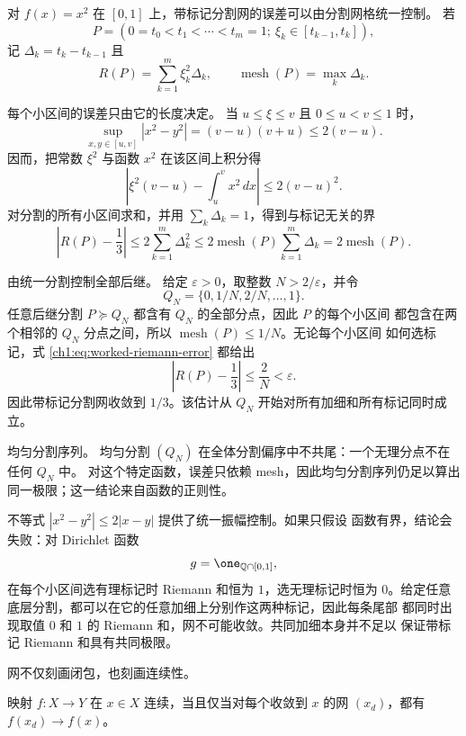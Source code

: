 \begin{example}[带标记分割网的误差估计]
\label{ch1:exa:worked-riemann-refinement}
对 $f(x)=x^2$ 在 $[0,1]$ 上，带标记分割网的误差可以由分割网格统一控制。
若
\[
 P=(0=t_0<t_1<\cdots<t_m=1;\ \xi_k\in[t_{k-1},t_k]),
\]
记 $\Delta_k=t_k-t_{k-1}$ 且
\[
 R(P)=\sum_{k=1}^m\xi_k^2\Delta_k,
 \qquad \operatorname{mesh}(P)=\max_k\Delta_k.
\]

\medskip
\noindent 每个小区间的误差只由它的长度决定。
当 $u\leq\xi\leq v$ 且 $0\leq u<v\leq1$ 时，
\[
 \sup_{x,y\in[u,v]}|x^2-y^2|
 =(v-u)(v+u)\leq2(v-u).
\]
因而，把常数 $\xi^2$ 与函数 $x^2$ 在该区间上积分得
\[
 \left|\xi^2(v-u)-\int_u^v x^2\,dx\right|
 \leq 2(v-u)^2.
\]
对分割的所有小区间求和，并用
$\sum_k\Delta_k=1$，得到与标记无关的界
\begin{equation}
 \left|R(P)-\frac13\right|
 \leq2\sum_{k=1}^m\Delta_k^2
 \leq2\operatorname{mesh}(P)\sum_{k=1}^m\Delta_k
 =2\operatorname{mesh}(P).
 \label{ch1:eq:worked-riemann-error}
\end{equation}

\medskip
\noindent 由统一分割控制全部后继。
给定 $\varepsilon>0$，取整数 $N>2/\varepsilon$，并令
\[
 Q_N=\{0,1/N,2/N,\ldots,1\}.
\]
任意后继分割 $P\succeq Q_N$ 都含有 $Q_N$ 的全部分点，因此 $P$ 的每个小区间
都包含在两个相邻的 $Q_N$ 分点之间，所以 $\operatorname{mesh}(P)\leq1/N$。无论每个小区间
如何选标记，式 \eqref{ch1:eq:worked-riemann-error} 都给出
\[
 \left|R(P)-\frac13\right|\leq\frac2N<\varepsilon.
\]
因此带标记分割网收敛到 $1/3$。该估计从 $Q_N$ 开始对所有加细和所有标记同时成立。

\medskip
\noindent 均匀分割序列。
均匀分割 $(Q_N)$ 在全体分割偏序中不共尾：一个无理分点不在任何 $Q_N$ 中。
对这个特定函数，误差只依赖 mesh，因此均匀分割序列仍足以算出同一极限；这一结论来自函数的正则性。

\medskip
不等式 $|x^2-y^2|\leq2|x-y|$ 提供了统一振幅控制。如果只假设
函数有界，结论会失败：对 Dirichlet 函数
\[
 g=\one_{\mathbb Q\cap[0,1]},
\]
在每个小区间选有理标记时 Riemann 和恒为 $1$，选无理标记时恒为
$0$。给定任意底层分割，都可以在它的任意加细上分别作这两种标记，因此每条尾部
都同时出现取值 $0$ 和 $1$ 的 Riemann 和，网不可能收敛。共同加细本身并不足以
保证带标记 Riemann 和具有共同极限。
\end{example}

网不仅刻画闭包，也刻画连续性。

\begin{proposition}[连续性的网判据]
映射 \(f\colon X\to Y\) 在 \(x\in X\) 连续，当且仅当对每个收敛到 \(x\) 的网
\((x_d)\)，都有 \(f(x_d)\to f(x)\)。
\label{ch1:prop:continuity-net}
\end{proposition}

